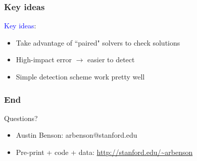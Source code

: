 \documentclass{beamer}
\begin{document}
\begin{frame}
\frametitle{Key ideas}

\textcolor{blue}{Key ideas}:
\begin{itemize}
\item Take advantage of ``paired" solvers to check solutions
\item High-impact error $\to$ easier to detect
\item Simple detection scheme work pretty well
\end{itemize}

\end{frame}

%
\begin{frame}
\frametitle{End}

Questions?

\vspace{1cm}

\begin{itemize}
\item Austin Benson: arbenson@stanford.edu
\item Pre-print + code + data: \url{http://stanford.edu/~arbenson}
\end{itemize}
\end{frame}
\end{document}
